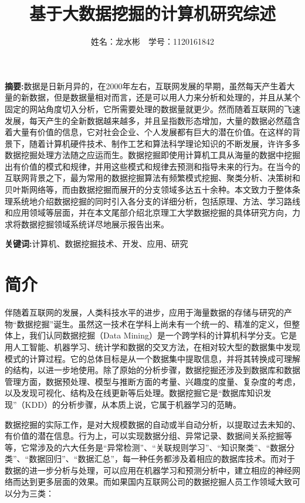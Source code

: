 \documentclass{elegantpaper}
\title{基于大数据挖掘的计算机研究综述}
\author{姓名：龙水彬\ \ 学号：1120161842}
\date{}
\begin{document}
\maketitle

\textbf{摘要:}数据是日新月异的，在2000年左右，互联网发展的早期，虽然每天产生着大量的新数据，但是数据量相对而言，还是可以用人力来分析和处理的，并且从某个固定的网站角度切入分析，它所需要处理的数据量就更少。然而随着互联网的飞速发展，每天产生的全新数据越来越多，并且呈指数形态增加，大量的数据必然蕴含着大量有价值的信息，它对社会企业、个人发展都有巨大的潜在价值。在这样的背景下，随着计算机硬件技术、制作工艺和算法科学理论知识的不断发展，许许多多数据挖掘处理方法随之应运而生。数据挖掘即使用计算机工具从海量的数据中挖掘出有价值的模式和规律，并用这些模式和规律去预测和指导未来的行为。在当今的互联网背景之下，最为常用的数据挖掘算法有频繁模式挖掘、聚类分析、决策树和贝叶斯网络等，而由数据挖掘而展开的分支领域多达五十余种。本文致力于整体条理系统地介绍数据挖掘的同时引入各分支的详细分析，包括原理、方法、学习路线和应用领域等层面，并在本文尾部介绍北京理工大学数据挖掘的具体研究方向，力求将数据挖掘领域系统详尽地展示报告出来。

\textbf{关键词:}计算机、数据挖掘技术、开发、应用、研究

\section{简介}

伴随着互联网的发展，人类科技水平的进步，应用于海量数据的存储与研究的产物“数据挖掘”诞生。虽然这一技术在学科上尚未有一个统一的、精准的定义，但整体上，我们认同数据挖掘（Data Mining）是一个跨学科的计算机科学分支。它是用人工智能、机器学习、统计学和数据的交叉方法，在相对较大型的数据集中发现模式的计算过程。它的总体目标是从一个数据集中提取信息，并将其转换成可理解的结构，以进一步地使用。除了原始的分析步骤，数据挖掘还涉及到数据库和数据管理方面，数据预处理、模型与推断方面的考量、兴趣度的度量、复杂度的考虑，以及发现可视化、结构及在线更新等后处理。数据挖掘它是“数据库知识发现”（KDD）的分析步骤，从本质上说，它属于机器学习的范畴。

数据挖掘的实际工作，是对大规模数据的自动或半自动分析，以提取过去未知的、有价值的潜在信息。行为上，可以实现数据分组、异常记录、数据间关系挖掘等等，它常涉及的六大任务是“异常检测”、“关联规则学习”、“知识聚类”、“数据分类”、“数据回归”、“数据汇总”，每一种任务都涉及着相应的数据库技术。而对于数据的进一步分析与处理，可以应用在机器学习和预测分析中，建立相应的神经网络而达到更多层面的效果。而如果国内互联网公司的数据挖掘人员工作领域大致可以分为三类：
\end{document}
